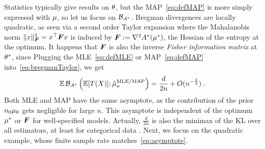 Statistics typically give results on $\theta$, but the MAP~\eqref{eq:defMAP} is more simply expressed with $\mu$, so let us focus on ${\mathcal B}_{A^*}$.
Bregman divergences are locally quadratic, as seen via a second order Taylor expansion
where the Mahalanobis norm  $\| x \|_{{\bm{F}}}^2 = x^\top {\bm{F}} x$  is induced by ${\bm{F}}  := \nabla^2{A^*}(\mu^*)$, the Hessian of the entropy at the optimum. It happens that  ${\bm{F}}$ is also the inverse \textit{Fisher information matrix} at $\theta^*$, since
Plugging the MLE~\eqref{eq:defMLE} or MAP~\eqref{eq:defMAP} into~\eqref{eq:bregmanTaylor}, we get
\begin{align}
	\label{eq:asymptote}
	\operatorname{\mathbb{E}} {\mathcal B}_{A^*} \left (\operatorname{\mathbb{E}} [T(X)] ; \hat {\mu}_n^\text{MLE/MAP} \right )
	= \frac{d}{2n} + O(n^{- \frac{3}{2}}) \; .
\end{align}
Both MLE and MAP have the same asymptote, as the contribution of the prior $n_0 \mu_0$ gets negligible for large $n$.
This asymptote is independent of the optimum $\mu^*$ or ${\bm{F}}$ for well-specified models.
Actually, $\frac{d}{2n}$ is also the minimax of the KL over all estimators, at least for categorical data \citep{braess2004bernstein, kamath2015learning}.
Next, we focus on the quadratic example,  whose finite sample rate matches~\eqref{eq:asymptote}.

